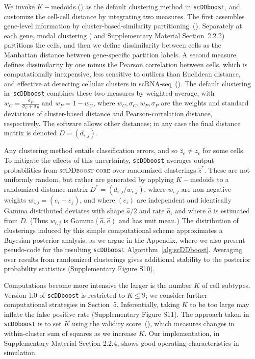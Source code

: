 \documentclass[aoas,preprint]{imsart}
\begin{document}
We invoke $K-$medoids (\cite{kmedoids}) 
as the default clustering method in \texttt{scDDboost}, and customize the cell-cell distance by integrating two measures.  
The first assembles gene-level information by cluster-based-similarity partitioning~(\cite{ref:cspa}).
 Separately at each gene,   modal clustering (\cite{ref:dahl} and Supplementary Material Section~2.2.2) partitions the cells, and
then we define dissimilarity between cells as the Manhattan distance between gene-specific 
partition labels.
A second measure defines dissimilarity by one minus the 
Pearson correlation between cells, which is computationally inexpensive,
less sensitive to outliers than Euclidean distance, and effective at detecting cellular clusters in 
scRNA-seq~(\cite{Cor}).
The default clustering in~\verb+scDDboost+ combines these 
two measures by weighted average, 
with  $w_C = \frac{\sigma_P}{\sigma_C + \sigma_P}$ and $w_P = 1 - w_C$, where $w_C,\sigma_C, w_P, \sigma_P$ are the weights and standard deviations of cluster-based distance and Pearson-correlation distance, respectively.  The software allows 
other distances; in any case 
the final distance matrix is denoted $D=\left( d_{i,j} \right)$. 

Any clustering method  entails classification errors, and so $\hat z_c \neq z_c$ for some cells. To mitigate
the effects of this uncertainty, \texttt{scDDboost} averages output probabilities from \textsc{scDDboost-core} over
randomized clusterings $\hat z^*$.  These are not uniformly random, but rather are generated by applying $K-$medoids
to a randomized distance matrix $D^*=\left( d_{i,j}/ w_{i,j}\right)$, 
where $w_{i,j}$ are   non-negative weights
$w_{i,j} = ( e_i + e_j )$, and where $( e_i) $ are independent and identically 
Gamma distributed deviates with shape $\hat a/2$  and rate $\hat a$, 
and where $\hat a$ is estimated from $D$. (Thus $w_{i,j}$ is Gamma$(\hat a, \hat a)$ and has unit mean.)  
The distribution of
clusterings induced by this simple computational 
scheme approximates a Bayesian posterior analysis, as we argue in
the Appendix, where we also present pseudo-code for the resulting \texttt{scDDboost} 
Algorithm~\ref{alg:scDDboost}.
Averaging over results from randomized clusterings 
 gives additional stability to the posterior probability statistics
 (Supplementary Figure S10).


Computations become more intensive the larger is the number $K$ of cell subtypes. Version 1.0 of 
\verb+scDDboost+ is restricted to $K\leq 9$; we consider further computational
strategies in Section~5. Inferentially, 
 taking $K$ to be too large may inflate the false positive rate (Supplementary Figure S11).
 The approach
taken in \verb+scDDboost+ is to set $K$ using the validity score~(\cite{selK}), which measures 
changes in within-cluster sum of squares as we increase $K$.  Our implementation,  in
Supplementary Material Section 2.2.4, shows good operating characteristics in simulation.
\end{document}

